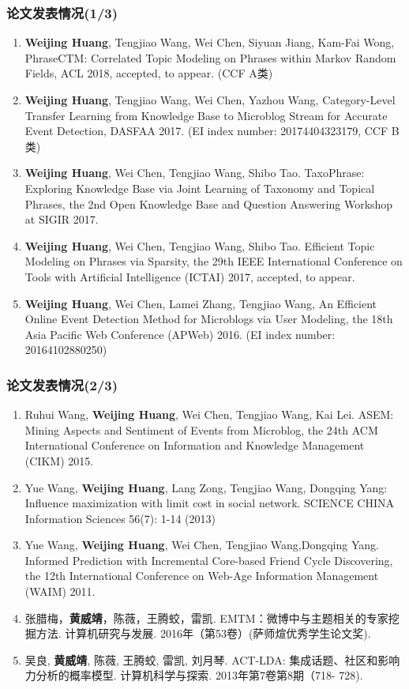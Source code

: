 \begin{frame}[plain]
\frametitle{论文发表情况(1/3)}

\footnotesize
\begin{enumerate}
\item \textbf{Weijing Huang}, Tengjiao Wang, Wei Chen, Siyuan Jiang, Kam-Fai Wong, PhraseCTM: Correlated Topic Modeling on Phrases within Markov Random Fields, ACL 2018, accepted, to appear. (CCF A类) 
\item \textbf{Weijing Huang}, Tengjiao Wang, Wei Chen, Yazhou Wang, Category-Level Transfer Learning from Knowledge Base to Microblog Stream for Accurate Event Detection, DASFAA 2017. (EI index number: 20174404323179, CCF B类)
\item \textbf{Weijing Huang}, Wei Chen, Tengjiao Wang, Shibo Tao. TaxoPhrase: Exploring Knowledge Base via Joint Learning of Taxonomy and Topical Phrases, the 2nd Open Knowledge Base and Question Answering Workshop at SIGIR 2017.
\item \textbf{Weijing Huang}, Wei Chen, Tengjiao Wang, Shibo Tao. Efficient Topic Modeling on Phrases via Sparsity, the 29th IEEE International Conference on Tools with Artificial Intelligence (ICTAI) 2017, accepted, to appear. 
\item \textbf{Weijing Huang}, Wei Chen, Lamei Zhang, Tengjiao Wang, An Efficient Online Event Detection Method for Microblogs via User Modeling, the 18th Asia Pacific Web Conference (APWeb) 2016. (EI index number: 20164102880250)
\end{enumerate}
\end{frame}

\begin{frame}[plain]
\frametitle{论文发表情况(2/3)}

\footnotesize
\begin{enumerate}\addtocounter{enumi}{5}
\item Ruhui Wang, \textbf{Weijing Huang}, Wei Chen, Tengjiao Wang, Kai Lei. ASEM: Mining Aspects and Sentiment of Events from Microblog, the 24th ACM International Conference on Information and Knowledge Management (CIKM) 2015.
\item Yue Wang, \textbf{Weijing Huang}, Lang Zong, Tengjiao Wang, Dongqing Yang: Influence maximization with limit cost in social network. SCIENCE CHINA Information Sciences 56(7): 1-14 (2013) 
\item Yue Wang, \textbf{Weijing Huang}, Wei Chen, Tengjiao Wang,Dongqing Yang. Informed Prediction with Incremental Core-based Friend Cycle Discovering, the 12th International Conference on Web-Age Information Management (WAIM) 2011. 
\item 张腊梅，\textbf{黄威靖}，陈薇，王腾蛟，雷凯. EMTM：微博中与主题相关的专家挖掘方法. 计算机研究与发展. 2016年（第53卷）(萨师煊优秀学生论文奖).
\item 吴良, \textbf{黄威靖}, 陈薇, 王腾蛟, 雷凯, 刘月琴. ACT-LDA: 集成话题、社区和影响力分析的概率模型. 计算机科学与探索. 2013年第7卷第8期（718- 728). 
\end{enumerate}
\end{frame}

